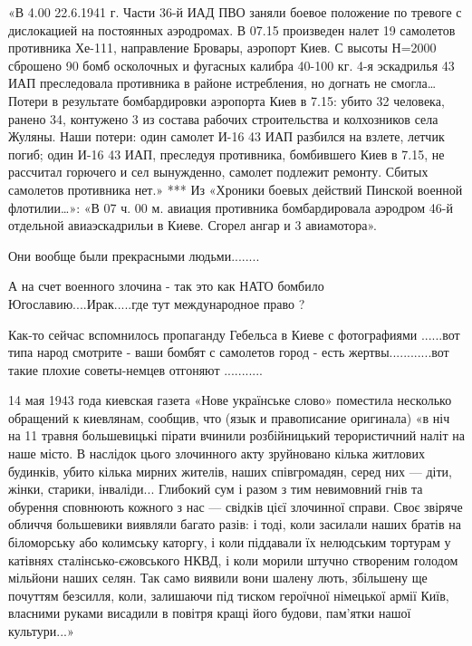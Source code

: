 \begin{itemize}
\begin{itemize}
\begin{itemize}
«В 4.00 22.6.1941 г. Части 36-й ИАД ПВО заняли боевое положение по тревоге с дислокацией на постоянных аэродромах.
В 07.15 произведен налет 19 самолетов противника Хе-111, направление Бровары, аэропорт Киев. С высоты Н=2000 сброшено 90 бомб осколочных и фугасных калибра 40-100 кг. 4-я эскадрилья 43 ИАП преследовала противника в районе истребления, но догнать не смогла…
Потери в результате бомбардировки аэропорта Киев в 7.15: убито 32 человека, ранено 34, контужено 3 из состава рабочих строительства и колхозников села Жуляны.
Наши потери: один самолет И-16 43 ИАП разбился на взлете, летчик погиб; один И-16 43 ИАП, преследуя противника, бомбившего Киев в 7.15, не рассчитал горючего и сел вынужденно, самолет подлежит ремонту.
Сбитых самолетов противника нет.»
***
Из «Хроники боевых действий Пинской военной флотилии…»:
«В 07 ч. 00 м. авиация противника бомбардировала аэродром 46-й отдельной авиаэскадрильи в Киеве. Сгорел ангар и 3 авиамотора».
\end{itemize} %

\end{itemize} %

Они вообще были прекрасными людьми........


А на счет военного злочина - так это как НАТО бомбило Югославию....Ирак.....где
тут международное право ?

\begin{itemize} %

Как-то сейчас вспомнилось пропаганду Гебельса в Киеве с фотографиями ......вот
типа народ смотрите - ваши бомбят с самолетов город - есть
жертвы............вот такие плохие советы-немцев отгоняют ...........



14 мая 1943 года киевская газета «Нове українське слово» поместила несколько
обращений к киевлянам, сообщив, что (язык и правописание оригинала) «в ніч на
11 травня большевицькі пірати вчинили розбійницький терористичний наліт на наше
місто. В наслідок цього злочинного акту зруйновано кілька житлових будинків,
убито кілька мирних жителів, наших співгромадян, серед них — діти, жінки,
старики, інваліди... Глибокий сум і разом з тим невимовний гнів та обурення
сповнюють кожного з нас — свідків цієї злочинної справи. Своє звіряче обличчя
большевики виявляли багато разів: і тоді, коли засилали наших братів на
біломорську або колимську каторгу, і коли піддавали їх нелюдським тортурам у
катівнях сталінсько-єжовського НКВД, і коли морили штучно створеним голодом
мільйони наших селян. Так само виявили вони шалену лють, збільшену ще почуттям
безсилля, коли, залишаючи під тиском героїчної німецької армії Київ, власними
руками висадили в повітря кращі його будови, пам’ятки нашої культури...»


\end{itemize}
\end{itemize}
